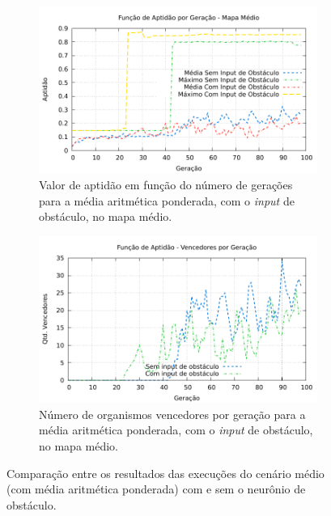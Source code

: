 \begin{figure}[H]
\centering
	\begin{subfigure}[b]{0.45\textwidth}
        \includegraphics[width=\textwidth]{fig/medium-wam-obs-fitness-experiment.pdf}
        \caption{Valor de aptidão em função do número de gerações para a média
        aritmética ponderada, com o \textit{input} de obstáculo, no mapa
        médio.}
	\end{subfigure}
	\begin{subfigure}[b]{0.45\textwidth}
        \includegraphics[width=\textwidth]{fig/medium-wam-obs-winners-experiment.pdf}
        \caption{Número de organismos vencedores por geração para a média
        aritmética ponderada, com o \textit{input} de obstáculo, no mapa
        médio.}
	\end{subfigure}

    \caption{Comparação entre os resultados das execuções do cenário médio (com
		média aritmética ponderada) com e sem o neurônio de obstáculo.}
	\label{fig:medium-wam-obs-fitness-experiment}
\end{figure}

